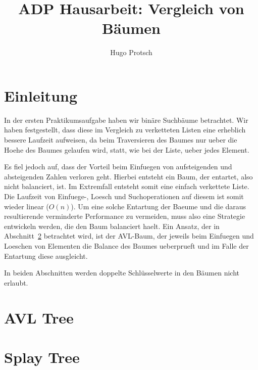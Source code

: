 \documentclass[11pt]{article}
\title{ADP Hausarbeit: Vergleich von Bäumen}
\author{Hugo Protsch}
\begin{document}
    \tableofcontents
    \newpage
    \section{Einleitung}\label{sec:Einleitung}

    In der ersten Praktikumsaufgabe haben wir binäre Suchbäume betrachtet.
    Wir haben festgestellt, dass diese im Vergleich zu verketteten Listen eine erheblich
    bessere Laufzeit aufweisen, da beim Traversieren des Baumes nur ueber die
    Hoehe des Baumes gelaufen wird, statt, wie bei der Liste, ueber jedes Element.

    Es fiel jedoch auf, dass der Vorteil beim Einfuegen von aufsteigenden und
    absteigenden Zahlen verloren geht.
    Hierbei entsteht ein Baum, der entartet, also nicht balanciert, ist.
    Im Extremfall entsteht somit eine einfach verkettete Liste.
    Die Laufzeit von Einfuege-, Loesch und Suchoperationen auf diesem
    ist somit wieder linear (\(O(n)\)).
    Um eine solche Entartung der Baeume und die daraus resultierende verminderte Performance
    zu vermeiden, muss also eine Strategie entwickeln werden, die den Baum balanciert haelt.
    Ein Ansatz, der in Abschnitt~\ref{sec:avl-tree} betrachtet wird, ist der AVL-Baum,
    der jeweils beim Einfuegen und Loeschen von Elementen die
    Balance des Baumes ueberprueft und im Falle der Entartung diese ausgleicht.

    In beiden Abschnitten werden doppelte Schlüsselwerte in den Bäumen nicht
    erlaubt.


    \section{AVL Tree}\label{sec:avl-tree}
    


    \section{Splay Tree}\label{sec:splay-tree}
    
\end{document}
